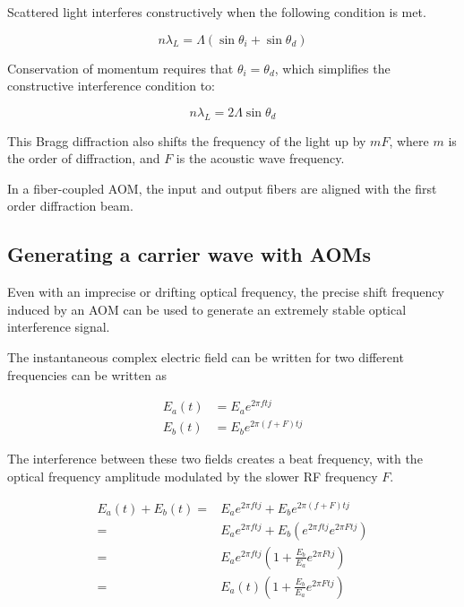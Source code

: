 Scattered light interferes constructively when the following condition is met.

\begin{equation} \label{eq:constructive_interference}
n \lambda_L = \Lambda (\sin{\theta_i} + \sin{\theta_d})
\end{equation}

Conservation of momentum requires that $\theta_i = \theta_d$, which simplifies the constructive interference condition to:

\begin{equation}
n \lambda_L = 2 \Lambda \sin{\theta_d}
\end{equation}

This Bragg diffraction also shifts the frequency of the light up by $mF$, where $m$ is the order of diffraction, and $F$ is the acoustic wave frequency. \cite{haus}

In a fiber-coupled AOM, the input and output fibers are aligned with the first order diffraction beam.

\subsection{Generating a carrier wave with AOMs}
\label{sec:aom_carrier}

Even with an imprecise or drifting optical frequency, the precise shift frequency induced by an AOM can be used to generate an extremely stable optical interference signal. \cite{hitzenberger}

The instantaneous complex electric field can be written for two different frequencies can be written as

\begin{align}
E_a(t) & = E_a e^{2 \pi ft j} \\
E_b(t) & = E_b e^{2 \pi (f + F)t j}
\end{align}

The interference between these two fields creates a beat frequency, with the optical frequency amplitude modulated by the slower RF frequency $F$.

\begin{align}
E_a(t) + E_b(t) = & E_a e^{2 \pi ftj} + E_b e^{2 \pi (f + F)t j} \\
= & E_a e^{2 \pi ft j} + E_b (e^{2 \pi ftj} e^{2 \pi Ftj}) \\
= & E_a e^{2 \pi ftj} (1 + \frac{E_b}{E_a} e^{2 \pi Ftj}) \\
= & E_a(t) (1 + \frac{E_b}{E_a} e^{2 \pi Ftj})
\end{align}

